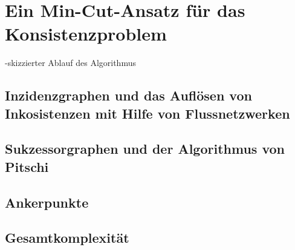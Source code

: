 \chapter{Ein Min-Cut-Ansatz für das Konsistenzproblem}
\label{ch:min-cut}
-skizzierter Ablauf des Algorithmus

\section{Inzidenzgraphen und das Auflösen von Inkosistenzen mit Hilfe von Flussnetzwerken}

\section{Sukzessorgraphen und der Algorithmus von Pitschi}

\section{Ankerpunkte}

\section{Gesamtkomplexität}